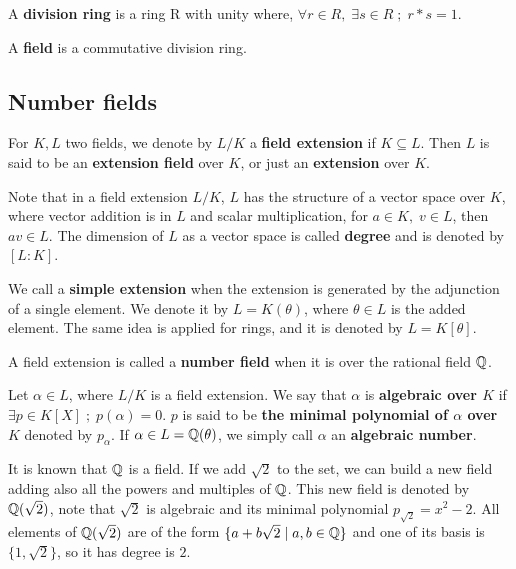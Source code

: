 \documentclass[a4paper,12pt]{article}
\begin{document}
\begin{definition}
  A \textbf{division ring} is a ring R with unity where, $\forall r \in R, \; \exists s \in R \; ; \; r*s = 1$.
\end{definition}

\begin{definition}
  A \textbf{field} is a commutative division ring.
\end{definition}
\subsection{Number fields}
\label{sec:org558d49c}
 \begin{definition}
  For $K, L$ two fields, we denote by $L/K$ a \textbf{field extension} if  $K \subseteq L$. Then $L$ is said to be an \textbf{ extension field} over $K$, or just an \textbf{extension} over $K$.
\end{definition}


\begin{text}
  Note that in a field extension \(L/K\), \(L\) has the structure of a vector space over
  \(K\), where vector addition is in \(L\) and scalar multiplication, for \(a \in K, \; v \in L\), then $av \in L$. The dimension of \(L\) as a vector space is called
  \textbf{degree} and is denoted by \([L:K]\).

  We call a \textbf{simple extension} when the extension is generated by the
  adjunction of a single element. We denote it by $L = K(\theta)$, where
  $\theta \in L$ is the added element. The same idea is applied for rings, and it is
  denoted by $L = K[\theta]$.

\end{text}

\begin{definition}
  A field extension is called a  \textbf{number field} when it is over the rational field $\mathbb{Q}$. 
\end{definition}

\begin{definition}
  Let $\alpha \in L$, where $L/K$ is a field extension. We say that $\alpha$ is
  \textbf{algebraic over $K$} if $\exists p \in K[X] \;;\; p(\alpha) = 0$. $p$ is said to be
  \textbf{the minimal polynomial of $\alpha$ over $K$} denoted by $p_\alpha$. If $\alpha \in L =
  \mathbb{Q}(\theta)$, we simply call $\alpha$ an \textbf{algebraic number}.
\end{definition}

\begin{example}
  It is known that $\mathbb{Q}$ is a field. If we add $\sqrt{2}$ to the set, we
  can build a new field adding also all the powers and multiples of
  $\mathbb{Q}$. This new field is denoted by $\mathbb{Q}(\sqrt{2})$, note that
  $\sqrt{2}$ is algebraic and its minimal polynomial $p_{\sqrt{2}} = x^2-2$. All
  elements of $\mathbb{Q}(\sqrt{2})$ are of the form $\{a+b\sqrt{2} \;|\; a,b \in
  \mathbb{Q}\}$ and one of its basis is $\{1, \sqrt{2}\}$, so it has degree is
  $2$.
\end{example}
\end{document}
